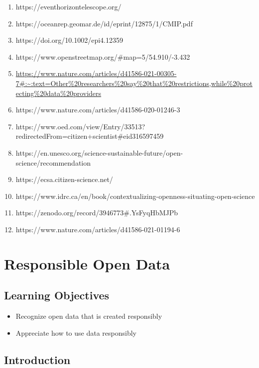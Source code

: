 \documentclass[
  letterpaper,
  DIV=11,
  numbers=noendperiod]{scrreport}
\providecommand{\tightlist}{%
  \setlength{\itemsep}{0pt}\setlength{\parskip}{0pt}}\usepackage{longtable,booktabs,array}
\begin{document}
\begin{enumerate}
\def\labelenumi{\arabic{enumi}.}
\tightlist
\item
  https://eventhorizontelescope.org/
\item
  https://oceanrep.geomar.de/id/eprint/12875/1/CMIP.pdf
\item
  https://doi.org/10.1002/epi4.12359
\item
  https://www.openstreetmap.org/\#map=5/54.910/-3.432
\item
  \url{https://www.nature.com/articles/d41586-021-00305-7\#:~:text=Other\%20researchers\%20say\%20that\%20restrictions,while\%20protecting\%20data\%20providers}
\item
  https://www.nature.com/articles/d41586-020-01246-3
\item
  https://www.oed.com/view/Entry/33513?redirectedFrom=citizen+scientist\#eid316597459
\item
  https://en.unesco.org/science-sustainable-future/open-science/recommendation
\item
  https://ecsa.citizen-science.net/
\item
  https://www.idrc.ca/en/book/contextualizing-openness-situating-open-science
\item
  https://zenodo.org/record/3946773\#.YsFyqHbMJPb
\item
  https://www.nature.com/articles/d41586-021-01194-6
\end{enumerate}

\hypertarget{responsible-open-data}{%
\chapter{Responsible Open Data}\label{responsible-open-data}}

\hypertarget{learning-objectives-1}{%
\section{Learning Objectives}\label{learning-objectives-1}}

\begin{itemize}
\tightlist
\item
  Recognize open data that is created responsibly
\item
  Appreciate how to use data responsibly
\end{itemize}

\hypertarget{introduction-12}{%
\section{Introduction}\label{introduction-12}}
\end{document}
